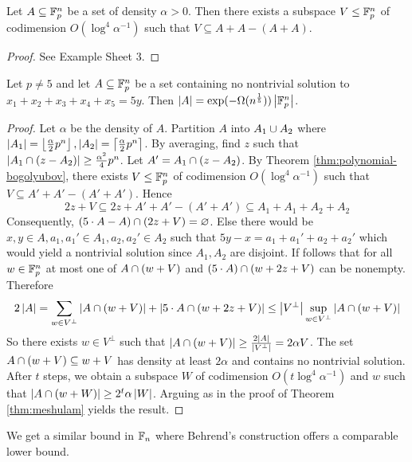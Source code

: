 \documentclass{article}
\begin{document}
\begin{nthm}\label{thm:polynomial-bogolyubov}
  Let $A \subseteq \mathbb F_p^n$ be a set of density $\alpha > 0$. Then there exists a subspace $V \le \mathbb F_p^n$ of codimension $O(\log^4\alpha^{-1})$ such that $V \subseteq A + A - (A + A)$.
\end{nthm}
\begin{proof}
  See Example Sheet 3.
\end{proof}

\begin{nthm}
  Let $p \ne 5$ and let $A \subseteq \mathbb F_p^n$ be a set containing no nontrivial solution to $x_1 + x_2 + x_3 + x_4 + x_5 = 5y$. Then $\left\lvert A\right\rvert = \exp(-\Omega(n^{\frac 15}))\left\lvert \mathbb F_p^n\right\rvert$.
\end{nthm}
\begin{proof}
  Let $\alpha$ be the density of $A$. Partition $A$ into $A_1 \cup A_2$ where $\left\lvert A_1\right\rvert = \left\lfloor \frac\alpha 2 p^n\right\rfloor, \left\lvert A_2\right\rvert = \left\lceil \frac\alpha 2 p^n\right\rceil$. By averaging, find $z$ such that $\left\lvert A_1 \cap (z - A_2)\right\rvert \ge \frac{\alpha^2}4 p^n$. Let $A' = A_1 \cap (z - A_2)$. By Theorem \ref{thm:polynomial-bogolyubov}, there exists $V \le \mathbb F_p^n$ of codimension $O(\log^4\alpha^{-1})$ such that $V \subseteq A' + A' - (A' + A')$. Hence
  $$2z + V \subseteq 2z + A' + A' - (A' + A') \subseteq A_1 + A_1 + A_2 + A_2$$
  Consequently, $(5 \cdot A - A) \cap (2z + V) = \varnothing$. Else there would be $x, y \in A, a_1, a_1' \in A_1, a_2, a_2' \in A_2$ such that $5y - x = a_1 + a_1' + a_2 + a_2'$ which would yield a nontrivial solution since $A_1, A_2$ are disjoint. If follows that for all $w \in \mathbb F_p^n$ at most one of $A \cap (w + V)$ and $(5 \cdot A) \cap (w + 2z + V)$ can be nonempty. Therefore
  $$2\left\lvert A\right\rvert = \sum_{w \in V^\perp} \left\lvert A \cap (w + V)\right\rvert + \left\lvert 5 \cdot A \cap (w + 2z + V)\right\rvert \le \left\lvert V^\perp\right\rvert \sup_{w \in V^\perp} \left\lvert A \cap (w + V)\right\rvert$$
  So there exists $w \in V^\perp$ such that $\left\lvert A \cap (w + V)\right\rvert \ge \frac{2\left\lvert A\right\rvert}{\left\lvert V^\perp\right\rvert} = 2\alpha V$. The set $A \cap (w + V) \subseteq w + V$ has density at least $2\alpha$ and contains no nontrivial solution. \\
  After $t$ steps, we obtain a subspace $W$ of codimension $O(t\log^4\alpha^{-1})$ and $w$ such that $\left\lvert A \cap (w + W)\right\rvert \ge 2^t\alpha \left\lvert W\right\rvert$. Arguing as in the proof of Theorem \ref{thm:meshulam} yields the result.
\end{proof}

We get a similar bound in $\mathbb F_n$ where Behrend's construction offers a comparable lower bound.
\end{document}

